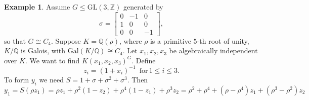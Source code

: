 \documentclass{article}
\theoremstyle{plain}
\theoremstyle{definition}
\newtheorem{example}[theorem]{Example}
\newcommand{\Z}{\ensuremath{\mathbb{Z}}}
\newcommand{\Q}{\ensuremath{\mathbb{Q}}}
\begin{document}
\begin{example}
Assume $G\leq \mathrm{GL}(3,\Z)$ generated by $$
\sigma = \begin{bmatrix}
0&-1&0\\
1&0&0\\
0&0&-1
\end{bmatrix}
,$$
so that $G \cong C_4$. Suppose $K= \Q(\rho)$, where $\rho$ is a primitive $5$-th root of unity, $K/\Q$ is Galois, with $\mathrm{Gal}(K/\Q) \cong C_4$. Let $x_1, x_2, x_3$ be algebraically independent over $K$. We want to find $K(x_1,x_2,x_3)^G$. 
%
\noindent
Define $$z_i = (1+x_i)^{-1}  \,\,\, \text{for} \, 1\leq i \leq 3. $$ 
\noindent
To form $y_i$ we need $S = 1+\sigma + \sigma^2 +\sigma ^3$. Then 
$$y_1 = S(\rho z_1) = \rho z_1 + \rho^2 (1-z_2) + \rho^4 (1-z_1) + \rho^3 z_2 = \rho^2+\rho^4 +(\rho - \rho^4)z_1 + (\rho^3 -\rho^2)z_2 $$ 

\end{example}
\end{document}
